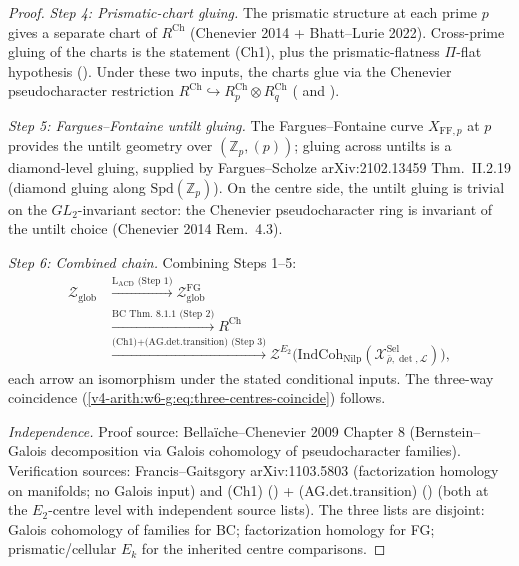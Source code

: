 \begin{proof}
\emph{Step 4: Prismatic-chart gluing.} The prismatic structure at
each prime \(p\) gives a separate chart of \(R^{\mathrm{Ch}}\)
(Chenevier 2014 + Bhatt--Lurie 2022). Cross-prime gluing of the
charts is the statement (Ch1), plus the prismatic-flatness
\(\Pi\)-flat hypothesis
(). Under these two
inputs, the charts glue via the Chenevier pseudocharacter
restriction \(R^{\mathrm{Ch}}\hookrightarrow R^{\mathrm{Ch}}_{p}\otimes R^{\mathrm{Ch}}_{q}\)
( and
).

\emph{Step 5: Fargues--Fontaine untilt gluing.} The
Fargues--Fontaine curve \(X_{\mathrm{FF},p}\) at \(p\) provides the
untilt geometry over \((\mathbb{Z}_{p},(p))\); gluing across untilts is
a diamond-level gluing, supplied by Fargues--Scholze arXiv:2102.13459
Thm.~II.2.19 (diamond gluing along \(\mathrm{Spd}(\mathbb{Z}_{p})\)).
On the centre side, the untilt gluing is trivial on the
\(GL_{2}\)-invariant sector: the Chenevier pseudocharacter ring is
invariant of the untilt choice (Chenevier 2014 Rem.~4.3).

\emph{Step 6: Combined chain.} Combining Steps 1--5:
\begin{align*}
\mathcal{Z}_{\mathrm{glob}}
&\xrightarrow{\text{L}_{\mathrm{ACD}}\text{ (Step 1)}}
\mathcal{Z}^{\mathrm{FG}}_{\mathrm{glob}}\\
&\xrightarrow{\text{BC Thm.~8.1.1 (Step 2)}}
R^{\mathrm{Ch}}\\
&\xrightarrow{\text{(Ch1)}+\text{(AG.det.transition) (Step 3)}}
\mathcal{Z}^{E_{2}}\bigl(\mathrm{IndCoh}_{\mathrm{Nilp}}(\mathcal{X}^{\mathrm{Sel}}_{\bar\rho,\det,\mathcal{L}})\bigr),
\end{align*}
each arrow an isomorphism under the stated conditional inputs. The
three-way coincidence
(\ref{v4-arith:w6-g:eq:three-centres-coincide}) follows.

\emph{Independence.} Proof source: Bella\"iche--Chenevier
2009 Chapter 8 (Bernstein--Galois decomposition via Galois
cohomology of pseudocharacter families). Verification sources:
Francis--Gaitsgory arXiv:1103.5803 (factorization homology on
manifolds; no Galois input) and (Ch1)
() + (AG.det.transition)
()
(both at the \(E_{2}\)-centre level with independent source lists).
The three lists are disjoint: Galois cohomology of families for
BC; factorization homology for FG; prismatic/cellular \(E_{k}\) for the
inherited centre comparisons.
\end{proof}

